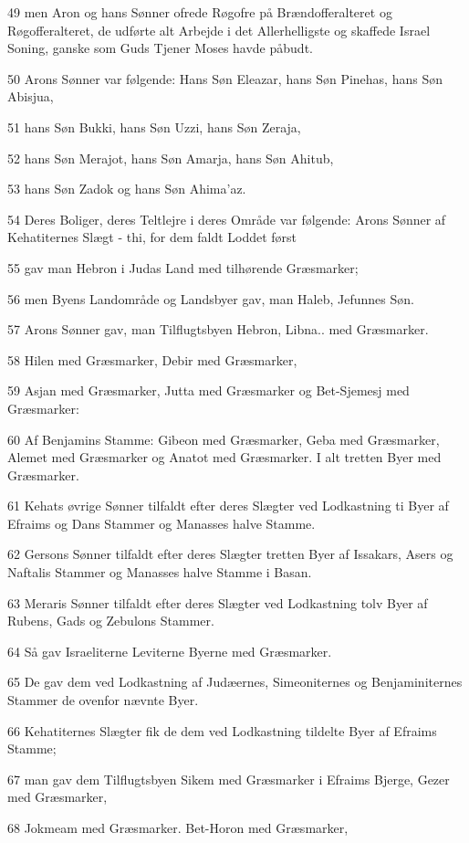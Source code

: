 \par 49 men Aron og hans Sønner ofrede Røgofre på Brændofferalteret og Røgofferalteret, de udførte alt Arbejde i det Allerhelligste og skaffede Israel Soning, ganske som Guds Tjener Moses havde påbudt.
\par 50 Arons Sønner var følgende: Hans Søn Eleazar, hans Søn Pinehas, hans Søn Abisjua,
\par 51 hans Søn Bukki, hans Søn Uzzi, hans Søn Zeraja,
\par 52 hans Søn Merajot, hans Søn Amarja, hans Søn Ahitub,
\par 53 hans Søn Zadok og hans Søn Ahima'az.
\par 54 Deres Boliger, deres Teltlejre i deres Område var følgende: Arons Sønner af Kehatiternes Slægt - thi, for dem faldt Loddet først
\par 55 gav man Hebron i Judas Land med tilhørende Græsmarker;
\par 56 men Byens Landområde og Landsbyer gav, man Haleb, Jefunnes Søn.
\par 57 Arons Sønner gav, man Tilflugtsbyen Hebron, Libna.. med Græsmarker.
\par 58 Hilen med Græsmarker, Debir med Græsmarker,
\par 59 Asjan med Græsmarker, Jutta med Græsmarker og Bet-Sjemesj med Græsmarker:
\par 60 Af Benjamins Stamme: Gibeon med Græsmarker, Geba med Græsmarker, Alemet med Græsmarker og Anatot med Græsmarker. I alt tretten Byer med Græsmarker.
\par 61 Kehats øvrige Sønner tilfaldt efter deres Slægter ved Lodkastning ti Byer af Efraims og Dans Stammer og Manasses halve Stamme.
\par 62 Gersons Sønner tilfaldt efter deres Slægter tretten Byer af Issakars, Asers og Naftalis Stammer og Manasses halve Stamme i Basan.
\par 63 Meraris Sønner tilfaldt efter deres Slægter ved Lodkastning tolv Byer af Rubens, Gads og Zebulons Stammer.
\par 64 Så gav Israeliterne Leviterne Byerne med Græsmarker.
\par 65 De gav dem ved Lodkastning af Judæernes, Simeoniternes og Benjaminiternes Stammer de ovenfor nævnte Byer.
\par 66 Kehatiternes Slægter fik de dem ved Lodkastning tildelte Byer af Efraims Stamme;
\par 67 man gav dem Tilflugtsbyen Sikem med Græsmarker i Efraims Bjerge, Gezer med Græsmarker,
\par 68 Jokmeam med Græsmarker. Bet-Horon med Græsmarker,
